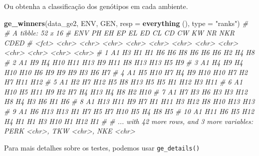 \documentclass[
]{book}
\newenvironment{Shaded}{\begin{snugshade}}{\end{snugshade}}
\newcommand{\CommentTok}[1]{\textcolor[rgb]{0.56,0.35,0.01}{\textit{#1}}}
\newcommand{\DataTypeTok}[1]{\textcolor[rgb]{0.13,0.29,0.53}{#1}}
\newcommand{\KeywordTok}[1]{\textcolor[rgb]{0.13,0.29,0.53}{\textbf{#1}}}
\newcommand{\NormalTok}[1]{#1}
\newcommand{\StringTok}[1]{\textcolor[rgb]{0.31,0.60,0.02}{#1}}
\numberwithin{equation}{section}
\begin{document}
Ou obtenha a classificação dos genótipos em cada ambiente.

\begin{Shaded}
\begin{Highlighting}[]
\KeywordTok{ge\_winners}\NormalTok{(data\_ge2, ENV, GEN, }\DataTypeTok{resp =} \KeywordTok{everything}\NormalTok{ (), }\DataTypeTok{type =} \StringTok{"ranks"}\NormalTok{)}
\CommentTok{\# \# A tibble: 52 x 16}
\CommentTok{\#    ENV   PH    EH    EP    EL    ED    CL    CD    CW    KW    NR    NKR   CDED }
\CommentTok{\#    \textless{}fct\textgreater{} \textless{}chr\textgreater{} \textless{}chr\textgreater{} \textless{}chr\textgreater{} \textless{}chr\textgreater{} \textless{}chr\textgreater{} \textless{}chr\textgreater{} \textless{}chr\textgreater{} \textless{}chr\textgreater{} \textless{}chr\textgreater{} \textless{}chr\textgreater{} \textless{}chr\textgreater{} \textless{}chr\textgreater{}}
\CommentTok{\#  1 A1    H3    H1    H1    H6    H6    H8    H6    H6    H6    H2    H4    H8   }
\CommentTok{\#  2 A1    H9    H4    H10   H11   H13   H9    H11   H8    H13   H13   H5    H9   }
\CommentTok{\#  3 A1    H4    H9    H4    H10   H10   H6    H9    H9    H9    H3    H6    H7   }
\CommentTok{\#  4 A1    H5    H10   H7    H4    H9    H10   H10   H7    H2    H7    H11   H12  }
\CommentTok{\#  5 A1    H2    H7    H12   H5    H8    H13   H5    H5    H1    H12   H3    H11  }
\CommentTok{\#  6 A1    H10   H5    H11   H9    H2    H7    H4    H13   H4    H8    H2    H10  }
\CommentTok{\#  7 A1    H7    H3    H6    H3    H3    H12   H8    H4    H3    H6    H1    H6   }
\CommentTok{\#  8 A1    H13   H11   H9    H7    H1    H11   H3    H12   H8    H10   H13   H13  }
\CommentTok{\#  9 A1    H6    H13   H13   H1    H7    H5    H7    H10   H5    H4    H8    H5   }
\CommentTok{\# 10 A1    H11   H6    H5    H12   H4    H1    H1    H3    H10   H1    H12   H1   }
\CommentTok{\# \# ... with 42 more rows, and 3 more variables: PERK \textless{}chr\textgreater{}, TKW \textless{}chr\textgreater{}, NKE \textless{}chr\textgreater{}}
\end{Highlighting}
\end{Shaded}

Para mais detalhes sobre os testes, podemos usar \texttt{ge\_details()}
\end{document}
